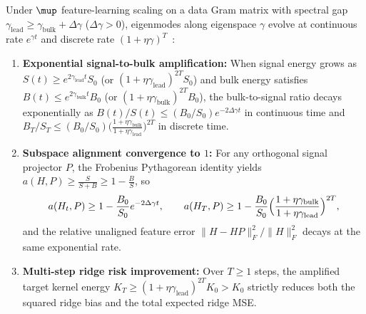 \begin{lemma}\label{lem:spectral_bias_mup}
\leanok
{}
Under $\mup$ feature-learning scaling on a data Gram matrix with spectral gap $\gamma_{\mathrm{lead}} \ge \gamma_{\mathrm{bulk}} + \Delta\gamma$ ($\Delta\gamma > 0$), eigenmodes along eigenspace $\gamma$ evolve at continuous rate $e^{\gamma t}$ and discrete rate $(1 + \eta\gamma)^T$~\cite{rahaman2019spectral}:
\begin{enumerate}
\item \textbf{Exponential signal-to-bulk amplification:} When signal energy grows as $S(t) \ge e^{2\gamma_{\mathrm{lead}} t} S_0$ (or $(1+\eta\gamma_{\mathrm{lead}})^{2T} S_0$) and bulk energy satisfies $B(t) \le e^{2\gamma_{\mathrm{bulk}} t} B_0$ (or $(1+\eta\gamma_{\mathrm{bulk}})^{2T} B_0$), the bulk-to-signal ratio decays exponentially as $B(t)/S(t) \le (B_0/S_0)e^{-2\Delta\gamma t}$ in continuous time and $B_T/S_T \le (B_0/S_0)\bigl(\frac{1+\eta\gamma_{\mathrm{bulk}}}{1+\eta\gamma_{\mathrm{lead}}}\bigr)^{2T}$ in discrete time.
\item \textbf{Subspace alignment convergence to $1$:} For any orthogonal signal projector $P$, the Frobenius Pythagorean identity yields $a(H, P) \ge \frac{S}{S+B} \ge 1 - \frac{B}{S}$, so
\[
a(H_t, P) \ge 1 - \frac{B_0}{S_0}e^{-2\Delta\gamma t},\qquad
a(H_T, P) \ge 1 - \frac{B_0}{S_0}\Bigl(\frac{1+\eta\gamma_{\mathrm{bulk}}}{1+\eta\gamma_{\mathrm{lead}}}\Bigr)^{2T},
\]
and the relative unaligned feature error $\lVert H - HP\rVert_F^2 / \lVert H\rVert_F^2$ decays at the same exponential rate.
\item \textbf{Multi-step ridge risk improvement:} Over $T\ge 1$ steps, the amplified target kernel energy $K_T \ge (1+\eta\gamma_{\mathrm{lead}})^{2T} K_0 > K_0$ strictly reduces both the squared ridge bias and the total expected ridge MSE.
\end{enumerate}
\end{lemma}

